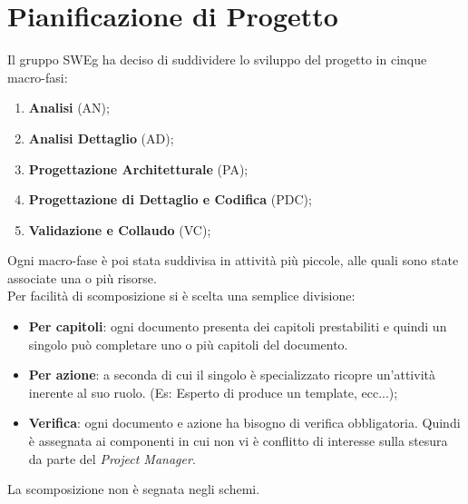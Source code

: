 \documentclass[12pt,a4paper,titlepage]{article}
\begin{document}
\section{Pianificazione di Progetto}
Il gruppo SWEg ha deciso di suddividere lo sviluppo del progetto in cinque macro-fasi:
\begin{enumerate}
	\item \textbf{Analisi} (AN);
	\item \textbf{Analisi Dettaglio} (AD);
	\item \textbf{Progettazione Architetturale} (PA);
	\item \textbf{Progettazione di Dettaglio e Codifica} (PDC);
	\item \textbf{Validazione e Collaudo} (VC);
\end{enumerate}
Ogni macro-fase è poi stata suddivisa in attività più piccole, alle quali sono state associate una o più risorse. \\
Per facilità di scomposizione si è scelta una semplice divisione:
\begin{itemize}
	\item \textbf{Per capitoli}: ogni documento presenta dei capitoli prestabiliti e quindi un singolo può completare uno o più capitoli del documento.
	\item \textbf{Per azione}: a seconda di cui il singolo è specializzato ricopre un'attività inerente al suo ruolo. (Es: Esperto di produce un template, ecc...);
	\item \textbf{Verifica}: ogni documento e azione ha bisogno di verifica obbligatoria. Quindi è assegnata ai componenti in cui non vi è conflitto di interesse sulla stesura da parte del \textit{Project Manager}.
\end{itemize} 
La scomposizione non è segnata negli schemi. 
	
\end{document}
